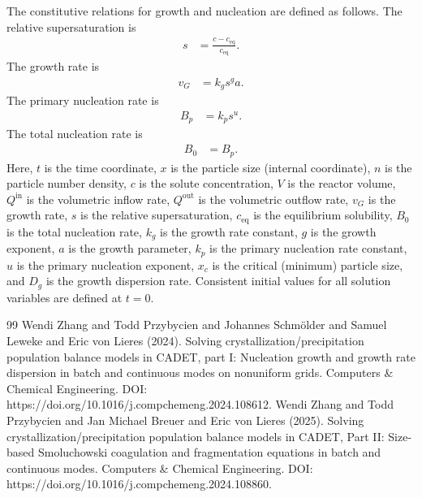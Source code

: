 \documentclass{article}
\begin{document}
The constitutive relations for growth and nucleation are defined as follows.
The relative supersaturation is
\begin{align}
    s
    &= \frac{c - c_{\mathrm{eq}}}{c_{\mathrm{eq}}}.
\end{align}
The growth rate is
\begin{align}
    v_{G}
    &= k_{g} s^{g} a.
\end{align}
The primary nucleation rate is
\begin{align}
    B_{p}
    &= k_{p} s^{u}.
\end{align}
The total nucleation rate is
\begin{align}
    B_{0}
    &= B_{p}.
\end{align}
Here, $t$ is the time coordinate, $x$ is the particle size (internal coordinate), $n$ is the particle number density, $c$ is the solute concentration, $V$ is the reactor volume, $Q^{\mathrm{in}}$ is the volumetric inflow rate, $Q^{\mathrm{out}}$ is the volumetric outflow rate, $v_{G}$ is the growth rate, $s$ is the relative supersaturation, $c_{\mathrm{eq}}$ is the equilibrium solubility, $B_{0}$ is the total nucleation rate, $k_{g}$ is the growth rate constant, $g$ is the growth exponent, $a$ is the growth parameter, $k_{p}$ is the primary nucleation rate constant, $u$ is the primary nucleation exponent, $x_{c}$ is the critical (minimum) particle size, and $D_{g}$ is the growth dispersion rate.
Consistent initial values for all solution variables are defined at $t = 0$.
\begin{thebibliography}{99}
     Wendi Zhang and Todd Przybycien and Johannes Schmölder and Samuel Leweke and Eric von Lieres (2024). Solving crystallization/precipitation population balance models in CADET, part I: Nucleation growth and growth rate dispersion in batch and continuous modes on nonuniform grids. Computers \& Chemical Engineering. DOI: https://doi.org/10.1016/j.compchemeng.2024.108612.
     Wendi Zhang and Todd Przybycien and Jan Michael Breuer and Eric von Lieres (2025). Solving crystallization/precipitation population balance models in CADET, Part II: Size-based Smoluchowski coagulation and fragmentation equations in batch and continuous modes. Computers \& Chemical Engineering. DOI: https://doi.org/10.1016/j.compchemeng.2024.108860.
\end{thebibliography}
\end{document}
